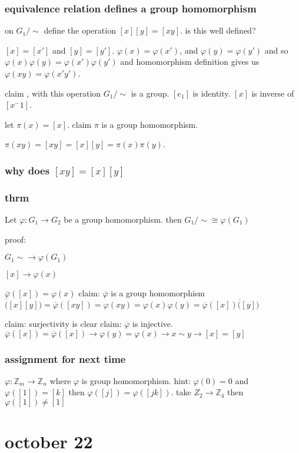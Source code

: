 \documentclass[letterpaper]{article}
\begin{document}
\subsubsection*{equivalence relation defines a group  homomorphism}
on $G_1/\sim$ define the operation $[x][y]=[xy]$. is this well defined?

$[x]=[x']$ and $[y]=[y']$. $\varphi(x)=\varphi(x')$, and $\varphi(y)=\varphi(y')$ and so $\varphi(x)\varphi(y)=\varphi(x')\varphi(y')$ and homomorphism definition gives us $\varphi(xy)=\varphi(x'y')$.

claim , with this operation $G_1/\sim$ is a group. $[e_1]$ is identity. $[x]$ is inverse of $[x^-1]$.

let $\pi(x)=[x]$. claim $\pi$ is a group homomorphism.

$\pi(xy)=[xy]=[x][y]=\pi(x)\pi(y)$.

\subsubsection*{why does $[xy]=[x][y]$}
\subsubsection*{thrm}
Let $\varphi:G_1\to G_2$ be a group homomorphism. then $G_1/\sim\cong\varphi(G_1)$

proof:

$G_1\sim\to\varphi(G_1)$

$[x]\to\varphi(x)$

$\overline\varphi([x])=\varphi(x)$
claim: $\overline\varphi$ is a group homomorphism
$\overline([x][y])=\overline\varphi([xy])=\varphi(xy)=\varphi(x)\varphi(y)=\overline\varphi([x])\overline([y])$

claim: surjectivity is clear
claim: $\overline\varphi$ is injective.
$\overline\varphi([x])=\overline{\varphi}([x])\to \varphi(y)=\varphi(x)\to x\sim y\to [x]=[y]$

\subsubsection*{assignment for next time}
$\varphi:\mathbb{Z}_m\to\mathbb{Z}_n$ where $\varphi$ is group homomorphism. hint: $\varphi(0)=0$ and $\varphi([1])=[k]$ then $\varphi([j])=\varphi([jk])$. take $Z_2\to\mathbb{Z}_4$ then $\varphi([1])\ne[1]$

\section*{october 22}
\end{document}
